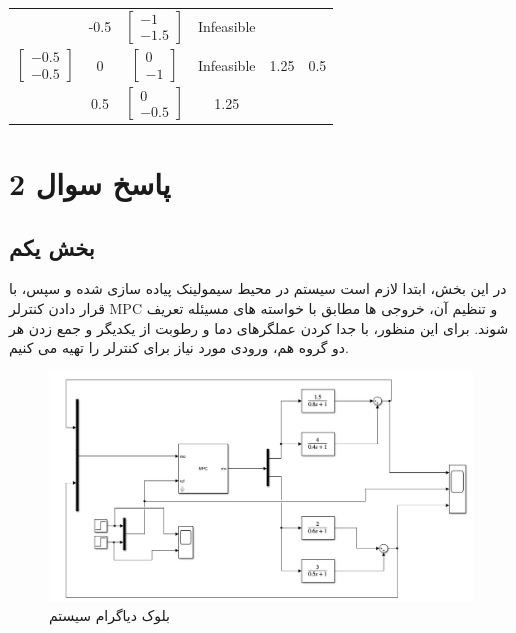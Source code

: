 \begin{latin}
\begin{longtable}{|c|c|c|c|c|c|}
		& -0.5 &$\begin{bmatrix} -1 \\ -1.5 \end{bmatrix}$      & Infeasible                        &            &        \\ \cline{2-4}
		\multirow{-3}{*}{$\begin{bmatrix} -0.5 \\ -0.5 \end{bmatrix}$}& 0   &$\begin{bmatrix} 0 \\ -1 \end{bmatrix}$      & Infeasible                        &    1.25       &  0.5	      \\ \cline{2-4}
		& 0.5 &$\begin{bmatrix} 0 \\ -0.5 \end{bmatrix}$      &    1.25                    &                &      \\ \hline
		
	\end{longtable}
\end{latin}
\section{پاسخ سوال 2}
\subsection{بخش یکم}
در این بخش، ابتدا لازم است سیستم در محیط سیمولینک پیاده سازی شده و سپس، با قرار دادن کنترلر MPC و تنظیم آن، خروجی ها مطابق با خواسته های مسیئله تعریف شوند. برای این منظور، با جدا کردن عملگرهای دما و رطوبت از یکدیگر و جمع زدن هر دو گروه هم، ورودی مورد نیاز برای کنترلر را تهیه می کنیم. 

\begin{figure}[H]
	\centering
	\includegraphics[width=1\linewidth]{../img/Q2_Block_Diagram}
	\caption{بلوک دیاگرام سیستم}
	\label{fig:q2blockdiagram}
\end{figure}

